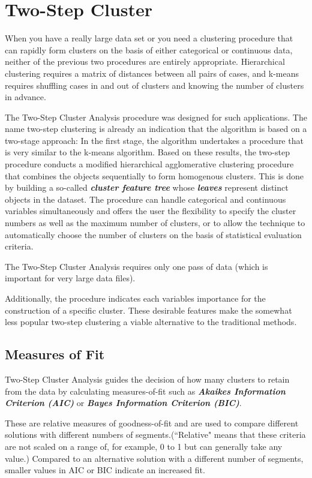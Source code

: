 \documentclass[a4paper,12pt]{article}
\begin{document}
\tableofcontents
\newpage
\newpage
\section{Two-Step Cluster}
When you have a really large data set or you need a clustering procedure that can rapidly form clusters on the basis of either categorical or continuous data, neither of the previous two procedures are entirely appropriate. Hierarchical clustering requires a matrix of distances between all pairs of cases, and k-means requires shuffling cases in and out of clusters and knowing the number of clusters in advance.

The Two-Step Cluster Analysis procedure was designed for such applications. The name two-step clustering is already an indication that the algorithm is based on a two-stage approach: In the first stage, the algorithm undertakes a procedure that is very similar to the k-means algorithm. Based on these results, the two-step
procedure conducts a modified hierarchical agglomerative clustering procedure that
combines the objects sequentially to form homogenous clusters. This is done by
building a so-called \textbf{\textit{cluster feature tree}} whose \textbf{\textit{leaves}} represent distinct objects in the dataset. The procedure can handle categorical and continuous variables simultaneously
and offers the user the flexibility to specify the cluster numbers as well as
the maximum number of clusters, or to allow the technique to automatically choose
the number of clusters on the basis of statistical evaluation criteria.

The Two-Step Cluster Analysis requires only one pass of data
(which is important for very large data files).

Additionally, the procedure indicates each variables
importance for the construction of a specific cluster. These desirable features make
the somewhat less popular two-step clustering a viable alternative to the traditional
methods.
\subsection{Measures of Fit}
Two-Step Cluster Analysis guides the decision of how many clusters to retain from the data by
calculating measures-of-fit such as \textbf{\textit{Akaikes Information Criterion (AIC)}} or \textbf{\textit{Bayes Information Criterion (BIC)}}.

These are relative measures of goodness-of-fit and are used to compare different
solutions with different numbers of segments.(``Relative" means that these criteria
are not scaled on a range of, for example, 0 to 1 but can generally take any value.)
Compared to an alternative solution with a different number of segments, smaller
values in AIC or BIC indicate an increased fit.
\end{document}
